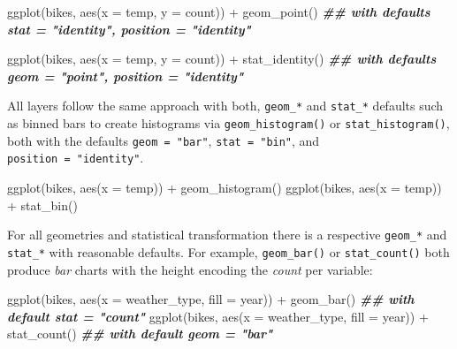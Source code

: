 \documentclass[
]{krantz}
\makeatletter
\newenvironment{Shaded}{\begin{snugshade}}{\end{snugshade}}
\newcommand{\AttributeTok}[1]{\textcolor[rgb]{0.61,0.61,0.61}{#1}}
\newcommand{\DocumentationTok}[1]{\textcolor[rgb]{0.37,0.37,0.37}{\textbf{\textit{#1}}}}
\newcommand{\FunctionTok}[1]{\textcolor[rgb]{0,0,0}{#1}}
\newcommand{\NormalTok}[1]{#1}
\newcommand{\SpecialCharTok}[1]{\textcolor[rgb]{0,0,0}{#1}}
\newenvironment{kframe}{%
\medskip{}
\setlength{\fboxsep}{.8em}
 \def\at@end@of@kframe{}%
 \ifinner\ifhmode%
  \def\at@end@of@kframe{\end{minipage}}%
  \begin{minipage}{\columnwidth}%
 \fi\fi%
 \def\FrameCommand##1{\hskip\@totalleftmargin \hskip-\fboxsep
 \colorbox{shadecolor}{##1}\hskip-\fboxsep
     \hskip-\linewidth \hskip-\@totalleftmargin \hskip\columnwidth}%
 \MakeFramed {\advance\hsize-\width
   \@totalleftmargin\z@ \linewidth\hsize
   \@setminipage}}%
 {\par\unskip\endMakeFramed%
 \at@end@of@kframe}
\renewenvironment{Shaded}{\begin{kframe}}{\end{kframe}}
\makeatother
\begin{document}
\begin{Shaded}
\begin{Highlighting}[]
\FunctionTok{ggplot}\NormalTok{(bikes, }\FunctionTok{aes}\NormalTok{(}\AttributeTok{x =}\NormalTok{ temp, }\AttributeTok{y =}\NormalTok{ count)) }\SpecialCharTok{+}
  \FunctionTok{geom\_point}\NormalTok{() }\DocumentationTok{\#\# with defaults \textasciigrave{}stat = "identity", position = "identity"\textasciigrave{}}

\FunctionTok{ggplot}\NormalTok{(bikes, }\FunctionTok{aes}\NormalTok{(}\AttributeTok{x =}\NormalTok{ temp, }\AttributeTok{y =}\NormalTok{ count)) }\SpecialCharTok{+}
  \FunctionTok{stat\_identity}\NormalTok{() }\DocumentationTok{\#\# with defaults \textasciigrave{}geom = "point", position = "identity"\textasciigrave{}}
\end{Highlighting}
\end{Shaded}

All layers follow the same approach with both, \texttt{geom\_*} and \texttt{stat\_*} defaults such as binned bars to create histograms via \texttt{geom\_histogram()} or \texttt{stat\_histogram()}, both with the defaults \texttt{geom\ =\ "bar"}, \texttt{stat\ =\ "bin"}, and \texttt{position\ =\ "identity"}.

\begin{Shaded}
\begin{Highlighting}[]
\FunctionTok{ggplot}\NormalTok{(bikes, }\FunctionTok{aes}\NormalTok{(}\AttributeTok{x =}\NormalTok{ temp)) }\SpecialCharTok{+} \FunctionTok{geom\_histogram}\NormalTok{() }
\FunctionTok{ggplot}\NormalTok{(bikes, }\FunctionTok{aes}\NormalTok{(}\AttributeTok{x =}\NormalTok{ temp)) }\SpecialCharTok{+} \FunctionTok{stat\_bin}\NormalTok{()}
\end{Highlighting}
\end{Shaded}

For all geometries and statistical transformation there is a respective \texttt{geom\_*} and \texttt{stat\_*} with reasonable defaults. For example, \texttt{geom\_bar()} or \texttt{stat\_count()} both produce \emph{bar} charts with the height encoding the \emph{count} per variable:

\begin{Shaded}
\begin{Highlighting}[]
\FunctionTok{ggplot}\NormalTok{(bikes, }\FunctionTok{aes}\NormalTok{(}\AttributeTok{x =}\NormalTok{ weather\_type, }\AttributeTok{fill =}\NormalTok{ year)) }\SpecialCharTok{+} \FunctionTok{geom\_bar}\NormalTok{() }\DocumentationTok{\#\# with default \textasciigrave{}stat = "count"\textasciigrave{}}
\FunctionTok{ggplot}\NormalTok{(bikes, }\FunctionTok{aes}\NormalTok{(}\AttributeTok{x =}\NormalTok{ weather\_type, }\AttributeTok{fill =}\NormalTok{ year)) }\SpecialCharTok{+} \FunctionTok{stat\_count}\NormalTok{() }\DocumentationTok{\#\# with default \textasciigrave{}geom = "bar"\textasciigrave{}}
\end{Highlighting}
\end{Shaded}
\end{document}
